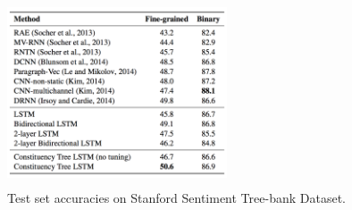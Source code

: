 \begin{figure}[ht!]
	\centering
		\includegraphics[height=55mm,  width=65mm]{figures/5_comparativeevaluation.png}
		\caption[Comparative Evaluation]{Test set accuracies on Stanford Sentiment Tree-bank Dataset.}
			\label{compareeval}
\end{figure}


